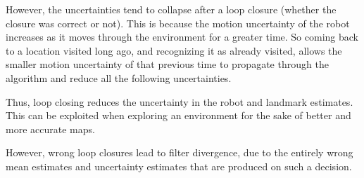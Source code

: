\documentclass[a4paper]{article}
\begin{document}
However, the uncertainties tend to collapse after a loop closure (whether the closure was correct or not). This is because the motion uncertainty of the robot increases as it moves through the environment for a greater time. So coming back to a location visited long ago, and recognizing it as already visited, allows the smaller motion uncertainty of that previous time to propagate through the algorithm and reduce all the following uncertainties.

Thus, loop closing reduces the uncertainty in the robot and landmark estimates. This can be exploited when exploring an environment for the sake of better and more accurate maps.

However, wrong loop closures lead to filter divergence, due to the entirely wrong mean estimates and uncertainty estimates that are produced on such a decision.
\end{document}
